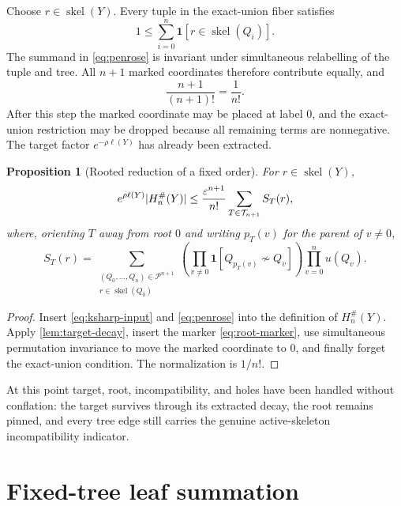 \documentclass[11pt,a4paper]{article}
\newtheorem{proposition}[theorem]{Proposition}
\theoremstyle{definition}
\newcommand{\skel}{\operatorname{skel}}
\newcommand{\Tree}{\mathcal T}
\newcommand{\Poly}{\mathcal P}
\newcommand{\eps}{\varepsilon}
\newcommand{\ind}{\mathbf 1}
\newcommand{\Hsharp}{H^{\#}}
\DeclarePairedDelimiter{\abs}{\lvert}{\rvert}
\begin{document}
Choose $r\in\skel(Y)$.  Every tuple in the exact-union fiber satisfies
\begin{equation}
  1\le\sum_{i=0}^{n}\ind[r\in\skel(Q_i)].
  \label{eq:root-marker}
\end{equation}
The summand in \eqref{eq:penrose} is invariant under simultaneous relabelling of the
tuple and tree.  All $n+1$ marked coordinates therefore contribute equally, and
\[
  \frac{n+1}{(n+1)!}=\frac1{n!}.
\]
After this step the marked coordinate may be placed at label $0$, and the exact-union
restriction may be dropped because all remaining terms are nonnegative.  The target
factor $e^{-\rho\ell(Y)}$ has already been extracted.

\begin{proposition}[Rooted reduction of a fixed order]
\label{prop:rooted-reduction}
For $r\in\skel(Y)$,
\begin{equation}
 e^{\rho\ell(Y)}\abs{\Hsharp_n(Y)}
 \le \frac{\eps^{n+1}}{n!}
    \sum_{T\in\Tree_{n+1}} S_T(r),
 \label{eq:rooted-reduction}
\end{equation}
where, orienting $T$ away from root $0$ and writing $p_T(v)$ for the parent of
$v\ne0$,
\begin{equation}
 S_T(r)=
 \sum_{\substack{(Q_0,\ldots,Q_n)\in\Poly^{n+1}\\r\in\skel(Q_0)}}
 \left(\prod_{v\ne0}\ind[Q_{p_T(v)}\not\sim Q_v]\right)
 \prod_{v=0}^{n}u(Q_v).
 \label{eq:fixed-tree-sum}
\end{equation}
\end{proposition}

\begin{proof}
Insert \eqref{eq:ksharp-input} and \eqref{eq:penrose} into the definition of
$\Hsharp_n(Y)$.  Apply \cref{lem:target-decay}, insert the marker
\eqref{eq:root-marker}, use simultaneous permutation invariance to move the marked
coordinate to $0$, and finally forget the exact-union condition.  The normalization is
$1/n!$.
\end{proof}

At this point target, root, incompatibility, and holes have been handled without
conflation: the target survives through its extracted decay, the root remains pinned,
and every tree edge still carries the genuine active-skeleton incompatibility indicator.

\section{Fixed-tree leaf summation}
\label{sec:leaf}
\end{document}
